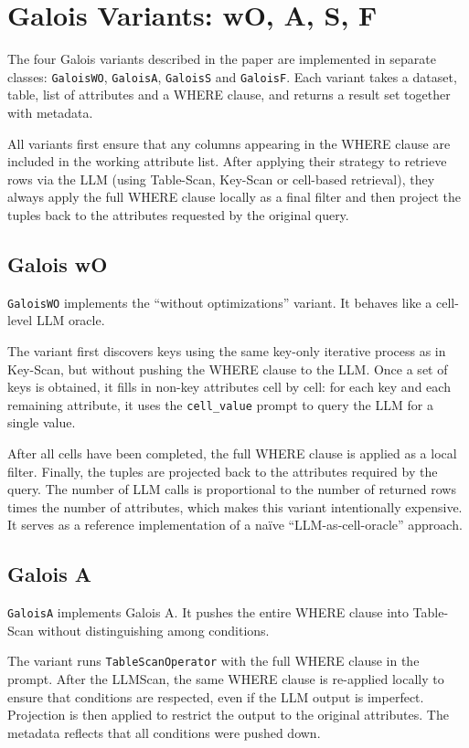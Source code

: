\documentclass[11pt]{article}
\begin{document}
\section{Galois Variants: wO, A, S, F}

The four Galois variants described in the paper are implemented in separate classes: \texttt{GaloisWO}, \texttt{GaloisA}, \texttt{GaloisS} and \texttt{GaloisF}. Each variant takes a dataset, table, list of attributes and a WHERE clause, and returns a result set together with metadata.

All variants first ensure that any columns appearing in the WHERE clause are included in the working attribute list. After applying their strategy to retrieve rows via the LLM (using Table-Scan, Key-Scan or cell-based retrieval), they always apply the full WHERE clause locally as a final filter and then project the tuples back to the attributes requested by the original query.

\subsection{Galois wO}

\texttt{GaloisWO} implements the ``without optimizations'' variant. It behaves like a cell-level LLM oracle.

The variant first discovers keys using the same key-only iterative process as in Key-Scan, but without pushing the WHERE clause to the LLM. Once a set of keys is obtained, it fills in non-key attributes cell by cell: for each key and each remaining attribute, it uses the \texttt{cell\_value} prompt to query the LLM for a single value.

After all cells have been completed, the full WHERE clause is applied as a local filter. Finally, the tuples are projected back to the attributes required by the query. The number of LLM calls is proportional to the number of returned rows times the number of attributes, which makes this variant intentionally expensive. It serves as a reference implementation of a naïve ``LLM-as-cell-oracle'' approach.

\subsection{Galois A}

\texttt{GaloisA} implements Galois A. It pushes the entire WHERE clause into Table-Scan without distinguishing among conditions.

The variant runs \texttt{TableScanOperator} with the full WHERE clause in the prompt. After the LLMScan, the same WHERE clause is re-applied locally to ensure that conditions are respected, even if the LLM output is imperfect. Projection is then applied to restrict the output to the original attributes. The metadata reflects that all conditions were pushed down.
\end{document}
